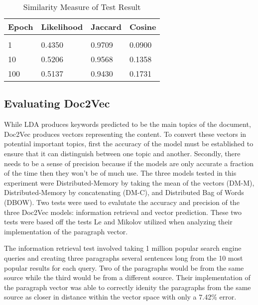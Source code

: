 \begin{table}[!htbp]
\caption{Similarity Measure of Test Result}
\label{lda-jc}
\begin{center}
\begin{tabular}{  l  l l l}
\bf Epoch & \bf Likelihood & \bf Jaccard & \bf Cosine \\ \hline \\
1         &0.4350 & 0.9709 & 0.0900\\
10       &0.5206 & 0.9568 & 0.1358\\
100     &0.5137 &  0.9430 & 0.1731\\
\end{tabular}
\end{center}
\end{table}

\subsection{Evaluating Doc2Vec}
While LDA produces keywords predicted to be the main topics of the document, Doc2Vec produces vectors representing the content. To convert these vectors in potential important topics, first the accuracy of the model must be established to ensure that it can distinguish between one topic and another. Secondly, there needs to be a sense of precision because if the models are only accurate a fraction of the time then they won't be of much use. The three models tested in this experiment were  Distributed-Memory by taking the mean of the vectors (DM-M), Distributed-Memory by concatenating (DM-C), and Distributed Bag of Words (DBOW). Two tests were used to evalutate the accuracy and precision of the three Doc2Vec models: information retrieval and vector prediction. These two tests were based off the tests Le and Mikolov utilized when analyzing their implementation of the paragraph vector. \cite{RefWorks:doc:5a6e5746e4b0d609eec798d7}

The information retrieval test involved taking 1 million popular search engine queries and creating three paragraphs several sentences long from the 10 most popular results for each query. Two of the paragraphs would be from the same source while the third would be from a different source. Their implementation of the paragraph vector was able to correctly idenity the paragraphs from the same source as closer in distance within the vector space with only a 7.42\% error. 

